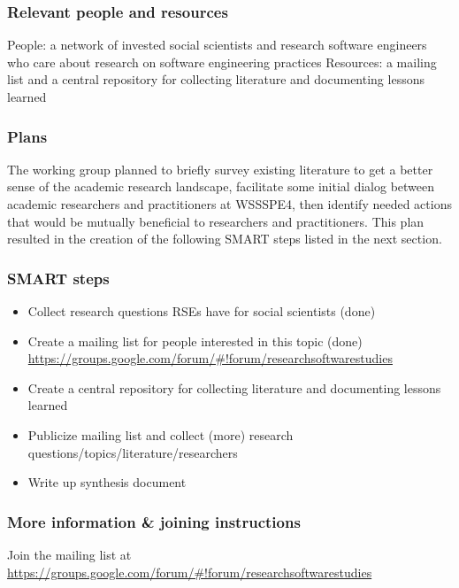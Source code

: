 \subsubsection{Relevant people and resources}

People: a network of invested social scientists and research software engineers who care about research on software engineering practices
Resources: a mailing list and a central repository for collecting literature and documenting lessons learned

\subsubsection{Plans}

The working group planned to briefly survey existing literature to get a better sense of the academic research landscape, facilitate some initial dialog between academic researchers and practitioners at WSSSPE4, then identify needed actions that would be mutually beneficial to researchers and practitioners. This plan resulted in the creation of the following SMART steps listed in the next section.

\subsubsection{SMART steps}

\begin{itemize}
\item Collect research questions RSEs have for social scientists (done)
\item Create a mailing list for people interested in this topic (done) \url{https://groups.google.com/forum/#!forum/researchsoftwarestudies}
\item Create a central repository for collecting literature and documenting lessons learned
\item Publicize mailing list and collect (more) research questions/topics/literature/researchers
\item Write up synthesis document 
\end{itemize}

\subsubsection{More information \& joining instructions}

Join the mailing list at \url{https://groups.google.com/forum/#!forum/researchsoftwarestudies}
